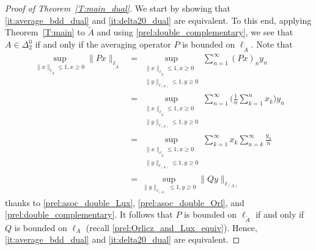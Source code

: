 \documentclass[nointlimits]{amsart}
\numberwithin{equation}{section}
\theoremstyle{plain}
\theoremstyle{definition}
\newcommand{\DTwo}{\Delta_2}
\newcommand{\DTwoZ}{\DTwo^0}
\newcommand{\tA}{\tilde{A}}
\newcommand{\lA}{\ell_A}
\newcommand{\ltA}{\ell_{\tA}}
\newcommand{\lAOrl}{\ell_{(A)}}
\begin{document}
\begin{proof}[Proof of Theorem~\ref{T:main_dual}]
    We start by showing that \ref{it:average_bdd_dual} and \ref{it:delta20_dual} are equivalent. To this end, applying Theorem~\ref{T:main} to $\tA$ and using \eqref{prel:double_complementary}, we see that $A\in\DTwoZ$ if and only if the averaging operator $P$ is bounded on $\ltA$. Note that
    \begin{align*}
        \sup_{\|x\|_{\ltA}\leq1, x\geq0}\|Px\|_{\ltA} &= \sup_{\substack{\|x\|_{\ltA}\leq1, x\geq0\\ \|y\|_{\lAOrl}\leq1, y\geq0}} \sum_{n=1}^\infty (Px)_n y_n \\
        &= \sup_{\substack{\|x\|_{\ltA}\leq1, x\geq0\\ \|y\|_{\lAOrl}\leq1, y\geq0}} \sum_{n=1}^\infty \Big( \frac1{n} \sum_{k = 1}^n x_k \Big) y_n \\
        &= \sup_{\substack{\|x\|_{\ltA}\leq1, x\geq0\\ \|y\|_{\lAOrl}\leq1, y\geq0}} \sum_{k = 1}^\infty x_k \sum_{n=k}^\infty \frac{y_n}{n} \\
        &= \sup_{\|y\|_{\lAOrl}\leq1, y\geq0} \|Qy\|_{\lAOrl}
    \end{align*}
    thanks to \eqref{prel:asoc_double_Lux}, \eqref{prel:asoc_double_Orl}, and \eqref{prel:double_complementary}. It follows that $P$ is bounded on $\ltA$ if and only if $Q$ is bounded on $\lA$ (recall \eqref{prel:Orlicz_and_Lux_equiv}). Hence, \ref{it:average_bdd_dual} and \ref{it:delta20_dual} are equivalent.


\end{proof}
\end{document}
